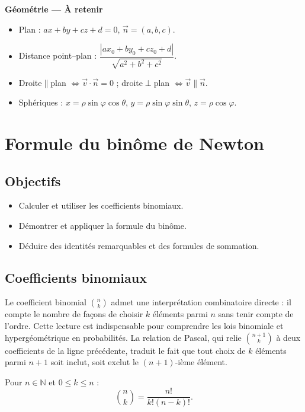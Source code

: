 \documentclass[11pt,a4paper,twoside]{book}
\newcommand{\N}{\mathbb{N}}
\begin{document}
\begin{retenirbox}
\textbf{Géométrie — À retenir}
\begin{itemize}
  \item Plan : $ax+by+cz+d=0$, $\vec{n}=(a,b,c)$.
  \item Distance point–plan : $\dfrac{|ax_0+by_0+cz_0+d|}{\sqrt{a^2+b^2+c^2}}$.
  \item Droite$\parallel$plan $\iff\vec{v}\cdot\vec{n}=0$ ; droite$\perp$plan $\iff\vec{v}\parallel\vec{n}$.
  \item Sphériques : $x=\rho\sin\varphi\cos\theta$, $y=\rho\sin\varphi\sin\theta$, $z=\rho\cos\varphi$.
\end{itemize}
\end{retenirbox}

\chapter{Formule du binôme de Newton}

\section*{Objectifs}
\begin{itemize}[leftmargin=1.5em]
  \item Calculer et utiliser les coefficients binomiaux.
  \item Démontrer et appliquer la formule du binôme.
  \item Déduire des identités remarquables et des formules de sommation.
\end{itemize}

\section{Coefficients binomiaux}

Le coefficient binomial $\binom{n}{k}$ admet une interprétation combinatoire directe : il compte le nombre de façons de choisir $k$ éléments parmi $n$ sans tenir compte de l'ordre. Cette lecture est indispensable pour comprendre les lois binomiale et hypergéométrique en probabilités. La relation de Pascal, qui relie $\binom{n+1}{k}$ à deux coefficients de la ligne précédente, traduit le fait que tout choix de $k$ éléments parmi $n+1$ soit inclut, soit exclut le $(n+1)$-ième élément.

\begin{definitionbox}
Pour $n \in \N$ et $0 \leq k \leq n$ :
\[
  \binom{n}{k} = \frac{n!}{k!(n-k)!}.
\]
\end{definitionbox}
\end{document}

